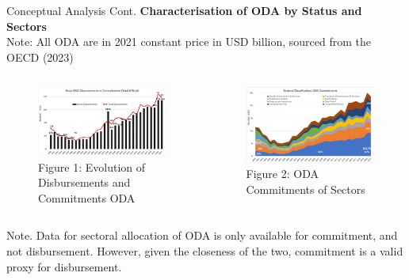 \documentclass[aspectratio=169,handout, 10pt]{beamer}
\begin{document}
\begin{frame}{Conceptual Analysis Cont.}
\textbf{Characterisation of ODA by Status and Sectors}\\
Note: All ODA are in 2021 constant price in USD billion, sourced from the OECD (2023)
\begin{columns}

            \begin{figure}
            \caption{Figure 1: Evolution of Disbursements and Commitments ODA}
            \includegraphics[width = \textwidth]{Figures and Tables/Dibs_VS_Commit.pdf}
        \end{figure}


   \begin{figure}
   \caption{Figure 2: ODA Commitments of Sectors}
            \includegraphics[width=\textwidth]{Figures and Tables/Sector_class.pdf}
            
        \end{figure}

        
    \end{columns}
\footnotesize{Note. Data for sectoral allocation of ODA is only available for commitment, and not disbursement. However, given the closeness of the two, commitment is a valid proxy for disbursement.}
\end{frame}
\end{document}
